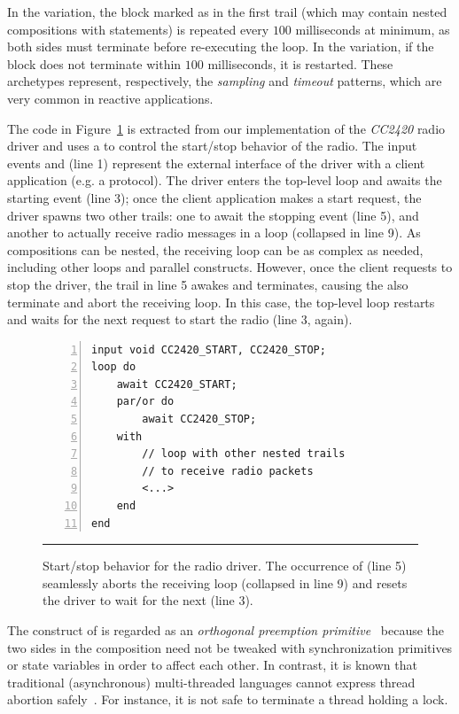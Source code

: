 In the  variation, the block marked as  in the first 
trail (which may contain nested compositions with  statements) is 
repeated every $100$ milliseconds at minimum, as both sides must terminate 
before re-executing the loop.
In the  variation, if the block does not terminate within $100$ 
milliseconds, it is restarted.
These archetypes represent, respectively, the \emph{sampling} and 
\emph{timeout} patterns, which are very common in reactive applications.

The code in Figure~\ref{lst.radio} is extracted from our implementation of the 
\emph{CC2420} radio driver and uses a  to control the start/stop 
behavior of the radio.
The input events  and  (line 1) 
represent the external interface of the driver with a client application (e.g.  
a protocol).
The driver enters the top-level loop and awaits the starting event (line 3);
once the client application makes a start request, the driver spawns two other 
trails:
one to await the stopping event (line 5),
and another to actually receive radio messages in a loop (collapsed in line 9).
%
As compositions can be nested, the receiving loop can be as complex as needed, 
including other loops and parallel constructs.
However, once the client requests to stop the driver, the trail in line 5 
awakes and terminates, causing the  also terminate and abort the 
receiving loop.
In this case, the top-level loop restarts and waits for the next request to 
start the radio (line 3, again).

\begin{figure}[t]
\begin{lstlisting}[numbers=left,xleftmargin=2em]
input void CC2420_START, CC2420_STOP;
loop do
    await CC2420_START;
    par/or do
        await CC2420_STOP;
    with
        // loop with other nested trails
        // to receive radio packets
        <...>
    end
end
\end{lstlisting}
\rule{14cm}{0.37pt}
\caption{ Start/stop behavior for the radio driver.\newline
{\small %
The occurrence of  (line 5) seamlessly aborts the receiving 
loop (collapsed in line 9) and resets the driver to wait for the next 
 (line 3).
}%
\label{lst.radio}
}
\end{figure}

The  construct of \CEU is regarded as an \emph{orthogonal 
preemption primitive}~\cite{esterel.preemption} because the two sides in the 
composition need not be tweaked with synchronization primitives or state 
variables in
order to affect each other.
In contrast, it is known that traditional (asynchronous) multi-threaded 
languages cannot express thread abortion 
safely~\cite{esterel.preemption,sync_async.threadsstop}.
For instance, it is not safe to terminate a thread holding a lock.

